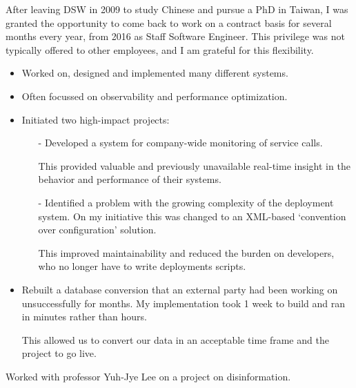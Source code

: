 \documentclass[10pt,a4paper]{../altacv}
\begin{document}
	After leaving DSW in 2009 to study Chinese and pursue a PhD in Taiwan, I was granted the opportunity to come back to work on a contract basis for several months every year, from 2016 as Staff Software Engineer. This privilege was not typically offered to other employees, and I am grateful for this flexibility.
	
	\medskip
	
	\begin{itemize}
		\item Worked on, designed and implemented many different systems.
		\smallskip
		\item Often focussed on observability and performance optimization.
		\smallskip
		\item Initiated two high-impact projects:
		\begin{itemize}
			\item[-] Developed a system for company-wide monitoring of service calls.
			
			This provided valuable and previously unavailable real-time insight in the behavior and performance of their systems.
			\smallskip
			\item[-] Identified a problem with the growing complexity of the deployment system. On my initiative this was changed to an XML-based ‘convention over configuration' solution.
			
			This improved maintainability and reduced the burden on developers, who no longer have to write deployments scripts.
		\end{itemize}
		\smallskip
		\item Rebuilt a database conversion that an external party had been working on unsuccessfully for months. My implementation took 1 week to build and ran in minutes rather than hours.
		
		This allowed us to convert our data in an acceptable time frame and the project to go live.
	\end{itemize}
	
	\medskip
	
	
	
	
	\bigskip\bigskip{}
	
	Worked with professor Yuh-Jye Lee on a project on disinformation.
	
	\medskip
	
\end{document}
